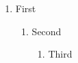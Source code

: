 \documentclass{article}
\begin{document}
\begin{enumerate}
\item First
\begin{enumerate}
\item Second
\begin{enumerate}
\item Third
\end{enumerate}
\end{enumerate}
\end{enumerate}
\end{document}
